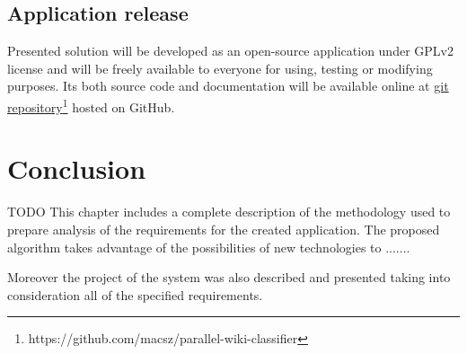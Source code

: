 \subsection{Application release}
Presented solution will be developed as an open-source application under GPLv2 license and will be freely available to everyone for using, testing or modifying purposes. Its both source code and documentation will be available online at \href{https://github.com/macsz/parallel-wiki-classifier}{git repository\footnote{https://github.com/macsz/parallel-wiki-classifier} hosted on GitHub}.


\section{Conclusion}
TODO
This chapter includes a complete description of the methodology used to prepare analysis of the requirements for the created application. The proposed algorithm takes advantage of the possibilities of new technologies to .......

Moreover the project of the system was also described and presented taking into consideration all of the specified requirements.
